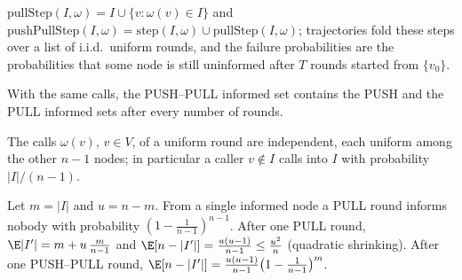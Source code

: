 \begin{definition}\label{def:pull}
  \leanok
  $\mathrm{pullStep}(I,\omega) = I \cup \{v : \omega(v) \in I\}$ and
  $\mathrm{pushPullStep}(I,\omega) = \mathrm{step}(I,\omega) \cup
  \mathrm{pullStep}(I,\omega)$; trajectories fold these steps over a list of
  i.i.d.\ uniform rounds, and the failure probabilities are the
  probabilities that some node is still uninformed after $T$ rounds started
  from $\{v_0\}$.
\end{definition}

\begin{lemma}\label{lem:pull-domination}
  \leanok
  With the same calls, the PUSH--PULL informed set contains the PUSH and the
  PULL informed sets after every number of rounds.
\end{lemma}

\begin{lemma}\label{lem:pull-indep}
  \leanok
  The calls $\omega(v)$, $v \in V$, of a uniform round are independent, each
  uniform among the other $n-1$ nodes; in particular a caller $v \notin I$
  calls into $I$ with probability $|I|/(n-1)$.
\end{lemma}

\begin{lemma}\label{lem:pull-oneround}
  \leanok
  Let $m = |I|$ and $u = n - m$. From a single informed node a PULL round
  informs nobody with probability $(1 - \frac1{n-1})^{n-1}$. After one PULL
  round, $\E|I'| = m + u\,\frac{m}{n-1}$ and
  $\E[n - |I'|] = \frac{u(u-1)}{n-1} \le \frac{u^2}{n}$ (quadratic
  shrinking). After one PUSH--PULL round,
  $\E[n - |I'|] = \frac{u(u-1)}{n-1}\bigl(1 - \frac1{n-1}\bigr)^{m}$.
\end{lemma}

